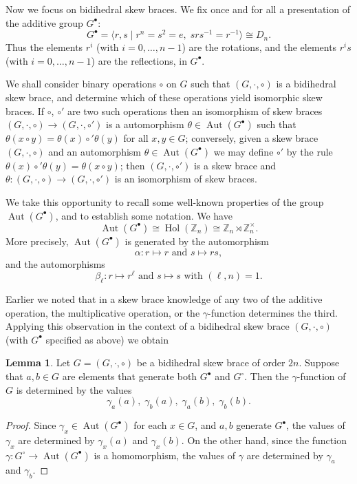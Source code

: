\documentclass[reqno]{amsart}
\theoremstyle{definition}
\newtheorem{lemma}[theorem]{Lemma}
\newcommand{\Z}{\mathbb{Z}}
\DeclareMathOperator{\Hol}{\mbox{Hol}}
\DeclareMathOperator{\Aut}{\mbox{Aut}}
\begin{document}
Now we focus on bidihedral skew braces. We fix once and for all a presentation of the additive group $ G^{\bullet} $:
\begin{equation} \label{eqn_G_cdot_presentation}
G^{\bullet} = \langle r,s \mid r^{n} = s^{2} = e, \; srs^{-1}=r^{-1} \rangle \cong D_{n}. 
\end{equation}
Thus the elements $ r^{i} $ (with $ i=0, \ldots ,n-1 $) are the rotations, and the elements $ r^{i}s $ (with $ i=0, \ldots ,n-1 $) are the reflections, in $ G^{\bullet} $. 

We shall consider binary operations $ \circ $ on $ G $ such that $ (G,\cdot,\circ) $ is a bidihedral skew brace, and determine which of these operations yield isomorphic skew braces. If $ \circ $, $ \circ' $ are two such operations then an isomorphism of skew braces $ (G,\cdot,\circ) \rightarrow (G,\cdot,\circ') $ is a automorphism $ \theta \in \Aut(G^{\bullet}) $ such that $ \theta(x \circ y) = \theta(x) \circ' \theta(y) $ for all $ x,y \in G $;  conversely, given a skew brace $ (G,\cdot,\circ) $ and an automorphism $ \theta \in \Aut(G^{\bullet}) $ we may define $ \circ' $ by the rule $ \theta(x) \circ' \theta(y) = \theta(x \circ y) $; then $ (G,\cdot,\circ') $ is a skew brace and $ \theta : (G,\cdot,\circ) \rightarrow (G,\cdot,\circ') $ is an isomorphism of skew braces. 

We take this opportunity to recall some well-known properties of the group $ \Aut(G^{\bullet}) $, and to establish some notation. We have 
\[ \Aut(G^{\bullet}) \cong \Hol(\Z_{n}) \cong \Z_{n} \rtimes \Z_{n}^{\times} . \]
More precisely, $ \Aut(G^{\bullet}) $ is generated by the automorphism
\[ \alpha : r \mapsto r \mbox{ and } s \mapsto rs, \]
and the automorphisms
\[ \beta_{\ell} : r \mapsto r^{\ell} \mbox{ and } s \mapsto s \mbox{ with } (\ell,n)=1. \]

Earlier we noted that in a skew brace knowledge of any two of the additive operation, the multiplicative operation, or the $ \gamma $-function determines the third. Applying this observation in the context of a bidihedral skew brace $ (G,\cdot,\circ) $ (with $ G^{\bullet} $ specified as above) we obtain 

\begin{lemma} \label{lem_gamma_fn_generators}
Let $ G=(G,\cdot,\circ) $ be a bidihedral skew brace of order $ 2n $. Suppose that $ a,b \in G $ are elements that generate both $ G^{\bullet} $ and $ G^{\circ} $. Then the $ \gamma $-function of $ G $ is determined by the values
\[ \gamma_{a}(a), \; \gamma_{b}(a), \; \gamma_{a}(b), \; \gamma_{b}(b). \] 
\end{lemma}
\begin{proof}
Since $ \gamma_{x} \in \Aut(G^{\bullet}) $ for each $ x \in G $, and $ a,b $ generate $ G^{\bullet} $, the values of $ \gamma_{x} $ are determined by $ \gamma_{x}(a) $ and $ \gamma_{x}(b) $. On the other hand, since the function $ \gamma : G^{\circ} \rightarrow \Aut(G^{\bullet}) $ is a homomorphism, the values of $ \gamma $ are determined by $ \gamma_{a} $ and $ \gamma_{b} $. 
\end{proof}
\end{document}
